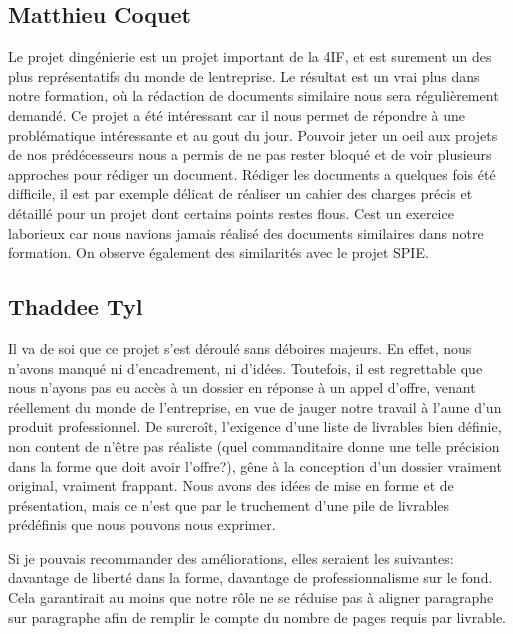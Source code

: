 \subsection{Matthieu Coquet}
Le projet dingénierie est un projet important de la 4IF, et est surement un des plus représentatifs du monde de lentreprise. Le résultat est un vrai plus dans notre formation, où la rédaction de documents similaire nous sera régulièrement demandé. 
Ce projet a été intéressant car il nous permet de répondre à une problématique intéressante et au gout du jour. Pouvoir jeter un oeil aux projets de nos prédécesseurs nous a permis de ne pas rester bloqué et de voir plusieurs approches pour rédiger un document. 
Rédiger les documents a quelques fois été difficile, il est par exemple délicat de réaliser un cahier des charges précis et détaillé pour un projet dont certains points restes flous. Cest un exercice laborieux car nous navions jamais réalisé des documents similaires dans notre formation. On observe également des similarités avec le projet SPIE.

\subsection{Thaddee Tyl}
Il va de soi que ce projet s'est déroulé sans déboires majeurs.  En effet, nous
n'avons manqué ni d'encadrement, ni d'idées.  Toutefois, il est regrettable que
nous n'ayons pas eu accès à un dossier en réponse à un appel d'offre, venant
réellement du monde de l'entreprise, en vue de jauger notre travail à l'aune
d'un produit professionnel.  De surcroît, l'exigence d'une liste de livrables
bien définie, non content de n'être pas réaliste (quel commanditaire donne une
telle précision dans la forme que doit avoir l'offre?), gêne à la conception
d'un dossier vraiment original, vraiment frappant.  Nous avons des idées de mise
en forme et de présentation, mais ce n'est que par le truchement d'une pile de
livrables prédéfinis que nous pouvons nous exprimer.

Si je pouvais recommander des améliorations, elles seraient les suivantes:
davantage de liberté dans la forme, davantage de professionnalisme sur le fond.
Cela garantirait au moins que notre rôle ne se réduise pas à aligner paragraphe
sur paragraphe afin de remplir le compte du nombre de pages requis par livrable.

